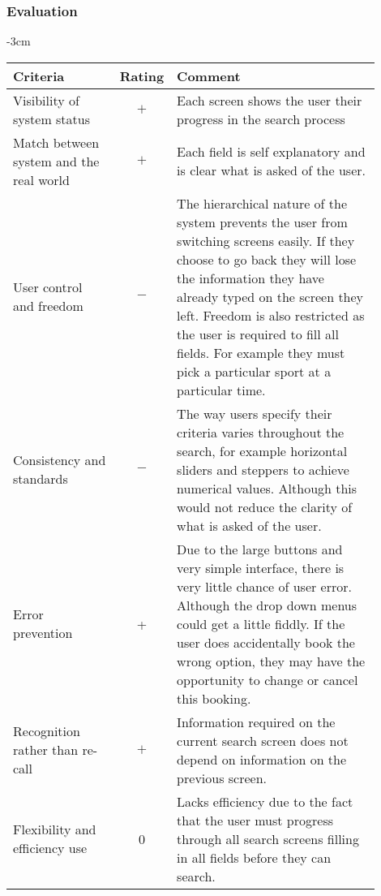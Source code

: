 \newpage
\subsubsection{Evaluation}

\begin{center}
	\begin{adjustwidth*}{}{-3cm}
	\renewcommand{\arraystretch}{2}
	\begin{longtable}{@{\extracolsep{\fill}}p{0.3\linewidth} c p{0.6\linewidth}}
		\toprule
		\textbf{Criteria} & \textbf{Rating} & \textbf{Comment}\\
		\midrule
		Visibility of system status & $+$ & Each screen shows the user their
		progress in the search process \\

		Match between system and the real world & $+$ & Each field is self
		explanatory and is clear what is asked of the user.  \\

		User control and freedom & $-$ & The hierarchical nature of the system
		prevents the user from switching screens easily. If they choose to go
		back they will lose the information they have already typed on the
		screen they left. Freedom is also restricted as the user is required to
		fill all fields. For example they must pick a particular sport at a
		particular time. \\

		Consistency and standards & $-$ & The way users specify their criteria
		varies throughout the search, for example horizontal sliders and
		steppers to achieve numerical values. Although this would not reduce
		the clarity of what is asked of the user. \\

		Error prevention & + & Due to the large buttons and very simple
		interface, there is very little chance of user error. Although the drop
		down menus could get a little fiddly. If the user does accidentally
		book the wrong option, they may have the opportunity to change or
		cancel this booking. \\

		Recognition rather than re-call & $+$ & Information required on the
		current search screen does not depend on information on the previous
		screen. \\

		Flexibility and efficiency use & 0 & Lacks efficiency due to the fact
		that the user must progress through all search screens filling in all
		fields before they can search. \\


\end{longtable}
\end{adjustwidth*}
\end{center}
